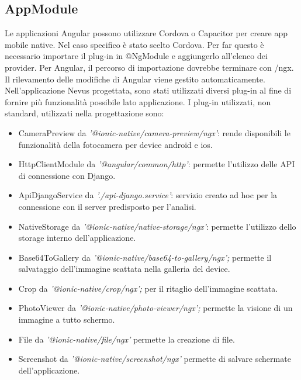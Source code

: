 {\subsection{AppModule}
Le applicazioni Angular possono utilizzare Cordova o Capacitor per creare app mobile native.
\newline
Nel caso specifico è stato scelto Cordova.
\newline
Per far questo è necessario importare il plug-in in @NgModule e aggiungerlo all'elenco dei provider.
\newline
Per Angular, il percorso di importazione dovrebbe terminare con /ngx. 
Il rilevamento delle modifiche di Angular viene gestito automaticamente.
Nell'applicazione Nevus progettata, sono stati utilizzati diversi plug-in al fine di fornire più funzionalità possibile lato applicazione.
I plug-in utilizzati, non standard, utilizzati nella progettazione sono:
\begin{itemize}
	\item CameraPreview da \textit{'@ionic-native/camera-preview/ngx'}:  rende disponibili le funzionalità della fotocamera per device android e ios.
	\item HttpClientModule da \textit{'@angular/common/http'}: permette l'utilizzo delle API di connessione con Django.
	\item ApiDjangoService da \textit{'./api-django.service'}: servizio creato ad hoc per la connessione con il server predisposto per l'analisi.
	\item NativeStorage da \textit{'@ionic-native/native-storage/ngx'}: permette l'utilizzo dello storage interno dell'applicazione.
	\item Base64ToGallery da \textit{'@ionic-native/base64-to-gallery/ngx';} permette il salvataggio dell'immagine scattata nella galleria del device.
	\item Crop da \textit{'@ionic-native/crop/ngx';} per il ritaglio dell'immagine scattata.
	\item PhotoViewer da \textit{'@ionic-native/photo-viewer/ngx';} permette la visione di un immagine a tutto schermo.
	\item File da \textit{'@ionic-native/file/ngx'} permette la creazione di file.
	\item Screenshot da \textit{'@ionic-native/screenshot/ngx'} permette di salvare schermate dell'applicazione.
\end{itemize}
\newpage
}

